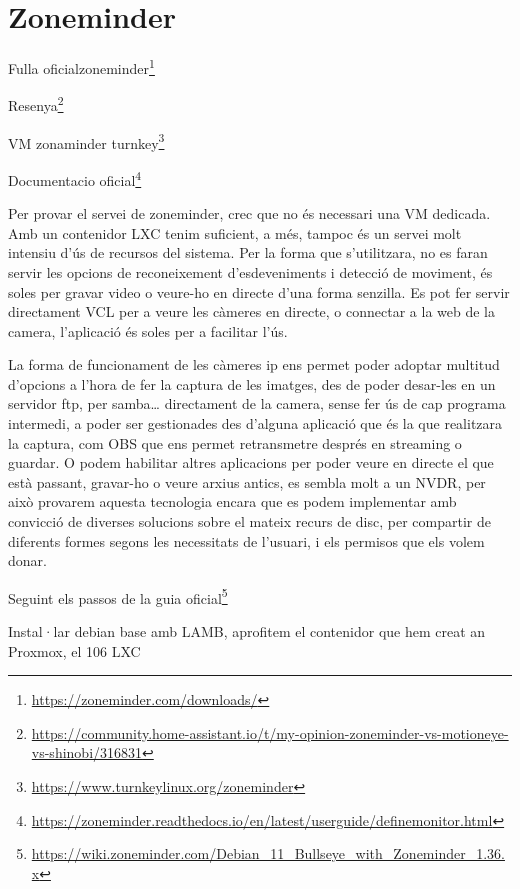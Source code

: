 \documentclass[
  10pt,
]{krantz}
\newenvironment{Shaded}{\begin{snugshade}}{\end{snugshade}}
\newcommand{\ExtensionTok}[1]{#1}
\newcommand{\NormalTok}[1]{#1}
\DeclareRobustCommand{\href}[2]{#2\footnote{\url{#1}}}
\begin{document}
\hypertarget{zoneminder}{%
\chapter{Zoneminder}\label{zoneminder}}

\href{https://zoneminder.com/downloads/}{Fulla oficialzoneminder}

\href{https://community.home-assistant.io/t/my-opinion-zoneminder-vs-motioneye-vs-shinobi/316831}{Resenya}

\href{https://www.turnkeylinux.org/zoneminder}{VM zonaminder turnkey}

\href{https://zoneminder.readthedocs.io/en/latest/userguide/definemonitor.html}{Documentacio oficial}

Per provar el servei de zoneminder, crec que no és necessari una VM dedicada. Amb un contenidor LXC tenim suficient, a més, tampoc és un servei molt intensiu d'ús de recursos del sistema. Per la forma que s'utilitzara, no es faran servir les opcions de reconeixement d'esdeveniments i detecció de moviment, és soles per gravar video o veure-ho en directe d'una forma senzilla. Es pot fer servir directament VCL per a veure les càmeres en directe, o connectar a la web de la camera, l'aplicació és soles per a facilitar l'ús.

La forma de funcionament de les càmeres ip ens permet poder adoptar multitud d'opcions a l'hora de fer la captura de les imatges, des de poder desar-les en un servidor ftp, per samba\ldots{} directament de la camera, sense fer ús de cap programa intermedi, a poder ser gestionades des d'alguna aplicació que és la que realitzara la captura, com OBS que ens permet retransmetre després en streaming o guardar. O podem habilitar altres aplicacions per poder veure en directe el que està passant, gravar-ho o veure arxius antics, es sembla molt a un NVDR, per això provarem aquesta tecnologia encara que es podem implementar amb convicció de diverses solucions sobre el mateix recurs de disc, per compartir de diferents formes segons les necessitats de l'usuari, i els permisos que els volem donar.

Seguint els passos de la \href{https://wiki.zoneminder.com/Debian_11_Bullseye_with_Zoneminder_1.36.x}{guia oficial}

Instal·lar debian base amb LAMB, aprofitem el contenidor que hem creat an Proxmox, el 106 LXC

\begin{Shaded}
\end{Shaded}
\end{document}
